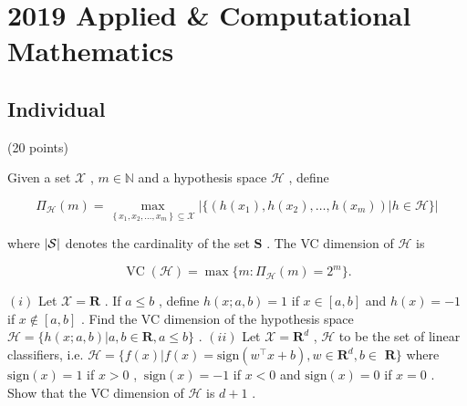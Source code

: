 \section{2019 Applied \& Computational Mathematics}\label{sec:2019-app-vc}

\subsection{Individual}

\begin{exercise}
\label{applied:2019:1}
(20 points)

Given a set $\mathcal { X }$ , $m \in \mathbb { N }$ and a hypothesis space $\mathcal { H }$ , define

\[
\Pi_ {\mathcal {H}} (m) = \max  _ {\left\{x _ {1}, x _ {2}, \dots , x _ {m} \right\} \subseteq \mathcal {X}} | \{(h (x _ {1}), h (x _ {2}), \dots , h (x _ {m})) | h \in \mathcal {H} \} |
\]

where $| { \cal S } |$ denotes the cardinality of the set $\boldsymbol { S }$ . The VC dimension of $\mathcal { H }$ is

\[
\operatorname {V C} (\mathcal {H}) = \max  \{m: \Pi_ {\mathcal {H}} (m) = 2 ^ {m} \}.
\]

$( i )$ Let $\mathcal { X } = \mathbf { R }$ . If $a \leqslant b$ , define $h ( x ; a , b ) = 1$ if $x \in [ a , b ]$ and $h ( x ) = - 1$ if $x \notin [ a , b ]$ . Find the VC dimension of the hypothesis space ${ \mathcal { H } } = \{ h ( x ; a , b ) | a , b \in \mathbf { R } , a \leqslant b \}$ .   
$( i i )$ Let $\mathcal { X } = \mathbf { R } ^ { d }$ , $\mathcal { H }$ to be the set of linear classifiers, i.e. $\mathcal { H } = \{ f ( x ) | f ( x ) = \mathrm { s i g n } ( w ^ { \top } x + b ) , w \in \mathbf { R } ^ { d } , b \in$ $\mathbf { R } \}$ where $\mathrm { s i g n } ( x ) = 1$ if $x > 0$ , $\ \mathrm { s i g n } ( x ) = - 1$ if $x < 0$ and $\mathrm { s i g n } ( x ) = 0$ if $x = 0$ . Show that the VC dimension of $\mathcal { H }$ is $d + 1$ .
\end{exercise}


